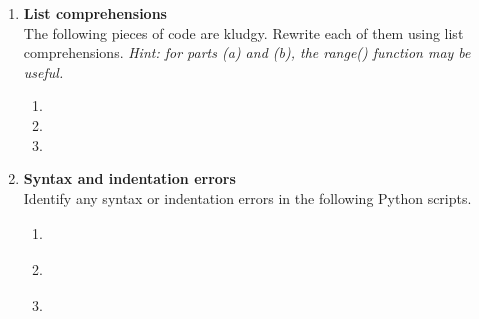 \documentclass{article}
\begin{document}
\begin{enumerate}


\item \textbf{List comprehensions} \\
The following pieces of code are kludgy.  Rewrite each of them using list comprehensions.  \emph{Hint: for parts (a) and (b), the range() function may be useful.}

\begin{enumerate}
\item 
\end{enumerate}

\begin{enumerate}
\setcounter{enumii}{1}
\item 
\end{enumerate}

\begin{enumerate}
\setcounter{enumii}{2}
\item 
\end{enumerate}

\item \textbf{Syntax and indentation errors} \\
Identify any syntax or indentation errors in the following Python scripts.

\begin{enumerate}
\item
\lstset{numbers=left}
\begin{tabular}{c}

\end{tabular}
\end{enumerate}

\begin{enumerate}
\setcounter{enumii}{1}
\item
\lstset{numbers=left}
\begin{tabular}{c}

\end{tabular}
\end{enumerate}

\begin{enumerate}
\setcounter{enumii}{2}
\item
\lstset{numbers=left}
\begin{tabular}{c}

\end{tabular}
\end{enumerate}



\end{enumerate}
\end{document}
